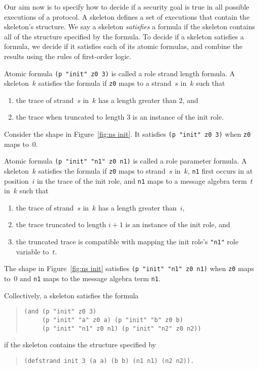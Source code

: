 \documentclass[12pt]{article}
\begin{document}
Our aim now is to specify how to decide if a security goal is true in
all possible executions of a protocol.  A skeleton defines a set of
executions that contain the skeleton's structure.  We say a skeleton
\emph{satisfies} a formula if the skeleton contains all of the
structure specified by the formula.  To decide if a skeleton
satisfies a formula, we decide if it satisfies each of its atomic
formulas, and combine the results using the rules of first-order
logic.

Atomic formula \texttt{(p "init" z0 3)} is called a role strand length
formula.  A skeleton~$k$ satisfies the formula if \texttt{z0} maps to
a strand~$s$ in~$k$ such that
\begin{enumerate}
\item the trace of strand~$s$ in~$k$ has a length greater than 2, and
\item the trace when truncated to length 3 is an instance of the init
  role.
\end{enumerate}
Consider the shape in Figure~\ref{fig:ns init}.  It satisfies
\texttt{(p "init" z0 3)} when \texttt{z0} maps to~0.

Atomic formula \texttt{(p "init" "n1" z0 n1)} is called a role
parameter formula.  A skeleton~$k$ satisfies the formula if
\texttt{z0} maps to strand~$s$ in~$k$, \texttt{n1} first occurs in at
position~$i$ in the trace of the init role, and \texttt{n1} maps to a
message algebra term~$t$ in~$k$ such that
\begin{enumerate}
\item the trace of strand~$s$ in~$k$ has a length greater than~$i$,
\item the trace truncated to length $i+1$ is an instance of the
  init role, and
\item the truncated trace is compatible with mapping the init role's
  \texttt{"n1"} role variable to~$t$.
\end{enumerate}
The shape in Figure~\ref{fig:ns init} satisfies \texttt{(p "init" "n1"
  z0 n1)} when \texttt{z0} maps to~0 and \texttt{n1} maps to the
message algebra term \texttt{n1}.

Collectively, a skeleton satisfies the formula
\begin{quote}
\begin{verbatim}
(and (p "init" z0 3)
     (p "init" "a" z0 a) (p "init" "b" z0 b)
     (p "init" "n1" z0 n1) (p "init" "n2" z0 n2))
\end{verbatim}
\end{quote}
if the skeleton contains the structure specified by
\begin{quote}
\begin{verbatim}
(defstrand init 3 (a a) (b b) (n1 n1) (n2 n2)).
\end{verbatim}
\end{quote}
\end{document}
